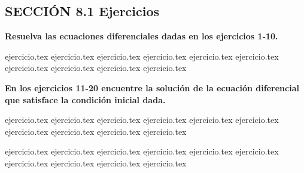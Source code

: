 
\subsection*{SECCIÓN 8.1 \quad Ejercicios}

\noindent\textbf{Resuelva las ecuaciones diferenciales dadas en los ejercicios 1-10.}
\begin{enumerate}
    {ejercicio.tex}
{ejercicio.tex}
{ejercicio.tex}
{ejercicio.tex}
{ejercicio.tex}
{ejercicio.tex}
{ejercicio.tex}
{ejercicio.tex}
{ejercicio.tex}
{ejercicio.tex}
\end{enumerate}

\vspace{0.5cm}
\noindent\textbf{En los ejercicios 11-20 encuentre la solución de la ecuación diferencial que satisface la condición inicial dada.}
\begin{enumerate}
    \setcounter{enumi}{10}
    {ejercicio.tex}
{ejercicio.tex}
{ejercicio.tex}
{ejercicio.tex}
{ejercicio.tex}
{ejercicio.tex}
{ejercicio.tex}
{ejercicio.tex}
{ejercicio.tex}
{ejercicio.tex}
\end{enumerate}

\vspace{0.5cm}
\begin{enumerate}
    \setcounter{enumi}{20}
    {ejercicio.tex}
{ejercicio.tex}
{ejercicio.tex}
{ejercicio.tex}
{ejercicio.tex}
{ejercicio.tex}
{ejercicio.tex}
{ejercicio.tex}
{ejercicio.tex}
{ejercicio.tex}
\end{enumerate}

